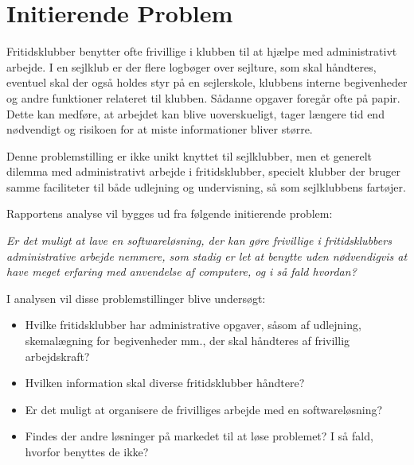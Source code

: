 \section{Initierende Problem}

Fritidsklubber benytter ofte frivillige i klubben til at hjælpe med administrativt
arbejde.  I en sejlklub er der flere
logbøger over sejlture, som skal håndteres, eventuel skal der også holdes styr på en sejlerskole, klubbens
interne begivenheder og andre funktioner relateret til klubben. Sådanne opgaver foregår ofte på papir. Dette
kan medføre, at arbejdet kan blive uoverskueligt, tager længere tid end nødvendigt og risikoen for at miste
informationer bliver større.

Denne problemstilling er ikke unikt knyttet til sejlklubber, men et generelt dilemma med administrativt
arbejde i fritidsklubber, specielt klubber der bruger samme faciliteter til både udlejning og undervisning, så
som sejlklubbens fartøjer.

Rapportens analyse vil bygges ud fra følgende initierende problem:

\textit{Er det muligt at lave en softwareløsning, der kan gøre frivillige i fritidsklubbers administrative
arbejde nemmere, som stadig er let at benytte uden nødvendigvis at have meget erfaring med anvendelse af
computere, og i så fald hvordan?}

I analysen vil disse problemstillinger blive undersøgt:

\begin{itemize}
  \item Hvilke fritidsklubber har administrative opgaver, såsom af udlejning, skemalægning for begivenheder mm., der
        skal håndteres af frivillig arbejdskraft?
  \item Hvilken information skal diverse fritidsklubber håndtere?
  \item Er det muligt at organisere de frivilliges arbejde med en softwareløsning?
  \item Findes der andre løsninger på markedet til at løse problemet? I så fald, hvorfor benyttes de ikke?
\end{itemize}